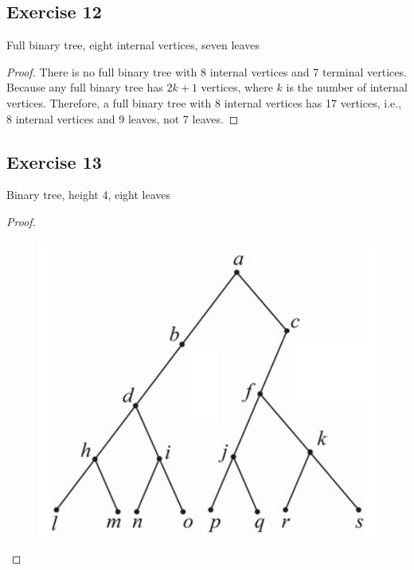 \documentclass[14pt]{extarticle}
\begin{document}
\subsection{Exercise 12}
Full binary tree, eight internal vertices, seven leaves
\begin{proof}
There is no full binary tree with 8 internal vertices and 7 terminal vertices. Because any full binary tree has \(2k+1\) 
vertices, where \(k\) is the number of internal vertices. Therefore, a full binary tree with 8 internal vertices has 17 
vertices, i.e., 8 internal vertices and 9 leaves, not 7 leaves.
\end{proof}

\subsection{Exercise 13}
Binary tree, height 4, eight leaves
\begin{proof}
\begin{figure}[ht!]
\centering
\includegraphics[scale=0.2]{../images/10.5.13.png}
\end{figure}
\end{proof}
\end{document}
